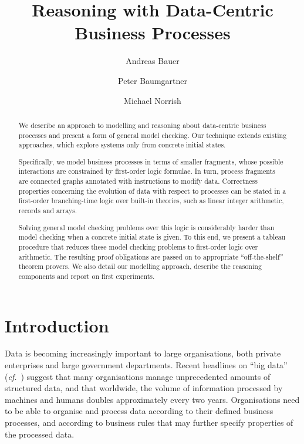 \documentclass{llncs}
\newcommand{\cf}{\textit{cf.}}
\begin{document}
\setlength{}
\setlength{}

\title{Reasoning with Data-Centric Business Processes}

\author{Andreas Bauer \and Peter Baumgartner \and Michael Norrish}

\maketitle

\pagestyle{plain}



\begin{abstract}
We describe an approach to modelling and reasoning about data-centric business processes and present a form of general model checking.
Our technique extends existing approaches, which explore systems only from concrete initial states.

Specifically, we model business processes in terms of smaller fragments, whose possible interactions are constrained by first-order logic formulae.
In turn, process fragments are connected graphs annotated with instructions to modify data.
Correctness properties concerning the evolution of data with respect to processes can be stated in a first-order branching-time logic over built-in theories, such as linear integer arithmetic, records and arrays.

Solving general model checking problems over this logic is considerably harder than model checking when a concrete initial state is given.
To this end, we present a tableau procedure that reduces these model checking problems to first-order logic over arithmetic. The resulting proof obligations are passed on to appropriate ``off-the-shelf'' theorem provers.
We also detail our modelling approach, describe the reasoning components and report on first experiments.

\end{abstract}



\section{Introduction}
Data is becoming increasingly important to large organisations, both private enterprises and large government departments.
Recent headlines on ``big data'' (\cf~\cite{NYT120212}) suggest that many organisations manage unprecedented amounts of structured data, and that worldwide, the volume of information processed by machines and humans doubles approximately every two years.
Organisations need to be able to organise and process data according to their defined business processes, and according to business rules that may further specify properties of the processed data.
\end{document}
